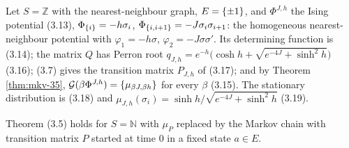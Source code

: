 \begin{example}
    \label{ex:mkv-315}
    \leanok

    Let $S = \mathbb{Z}$ with the nearest-neighbour graph, $E = \left\{ \pm 1 \right\}$, and
    $\Phi^{J,h}$ the Ising potential (3.13), $\Phi_{\left\{ i \right\}} = -h\sigma_i$,
    $\Phi_{\left\{ i,i+1 \right\}} = -J\sigma_i\sigma_{i+1}$: the homogeneous nearest-neighbour potential
    with $\varphi_1 = -h\sigma$, $\varphi_2 = -J\sigma\sigma'$. Its determining function is
    (3.14); the matrix $Q$ has Perron root
    $q_{J,h} = e^{-h}\bigl(\cosh h + \sqrt{e^{-4J} + \sinh^2 h}\bigr)$ (3.16); (3.7) gives the
    transition matrix $P_{J,h}$ of (3.17); and by Theorem \ref{thm:mkv-35},
    $\mathcal{G}(\beta\Phi^{J,h}) = \left\{ \mu_{\beta J,\beta h} \right\}$ for every $\beta$ (3.15). The
    stationary distribution is (3.18) and
    $\mu_{J,h}(\sigma_i) = \sinh h / \sqrt{e^{-4J} + \sinh^2 h}$ (3.19).
\end{example}

\begin{remark}
    \label{rmk:mkv-half-line}

    Theorem (3.5) holds for $S = \mathbb{N}$ with $\mu_P$ replaced by the Markov chain with
    transition matrix $P$ started at time $0$ in a fixed state $a \in E$.
\end{remark}
